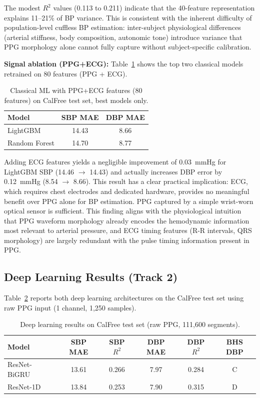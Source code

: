 \documentclass[11pt]{article}
\begin{document}
The modest $R^2$ values (0.113 to 0.211) indicate that the 40-feature representation explains 11--21\% of BP variance. This is consistent with the inherent difficulty of population-level cuffless BP estimation: inter-subject physiological differences (arterial stiffness, body composition, autonomic tone) introduce variance that PPG morphology alone cannot fully capture without subject-specific calibration.

\textbf{Signal ablation (PPG+ECG):} Table~\ref{tab:classical_ppgecg} shows the top two classical models retrained on 80 features (PPG + ECG).

\begin{table}[ht!]
\centering
\begin{tabular}{@{}lcc@{}}
\toprule
\textbf{Model} & \textbf{SBP MAE} & \textbf{DBP MAE} \\
\midrule
LightGBM      & 14.43 & 8.66 \\
Random Forest  & 14.70 & 8.77 \\
\bottomrule
\end{tabular}
\caption{Classical ML with PPG+ECG features (80 features) on CalFree test set, best models only.}
\label{tab:classical_ppgecg}
\end{table}

Adding ECG features yields a negligible improvement of 0.03~mmHg for LightGBM SBP (14.46 $\to$ 14.43) and actually increases DBP error by 0.12~mmHg (8.54 $\to$ 8.66). This result has a clear practical implication: ECG, which requires chest electrodes and dedicated hardware, provides no meaningful benefit over PPG alone for BP estimation. PPG captured by a simple wrist-worn optical sensor is sufficient. This finding aligns with the physiological intuition that PPG waveform morphology already encodes the hemodynamic information most relevant to arterial pressure, and ECG timing features (R-R intervals, QRS morphology) are largely redundant with the pulse timing information present in PPG.

\subsection{Deep Learning Results (Track 2)}

Table~\ref{tab:dl_calfree} reports both deep learning architectures on the CalFree test set using raw PPG input (1 channel, 1,250 samples).

\begin{table}[ht!]
\centering
\begin{tabular}{@{}lccccc@{}}
\toprule
\textbf{Model} & \textbf{SBP MAE} & \textbf{SBP $R^2$} & \textbf{DBP MAE} & \textbf{DBP $R^2$} & \textbf{BHS DBP} \\
\midrule
ResNet-BiGRU & 13.61 & 0.266 & 7.97 & 0.284 & C \\
ResNet-1D    & 13.84 & 0.253 & 7.90 & 0.315 & D \\
\bottomrule
\end{tabular}
\caption{Deep learning results on CalFree test set (raw PPG, 111,600 segments).}
\label{tab:dl_calfree}
\end{table}
\end{document}
